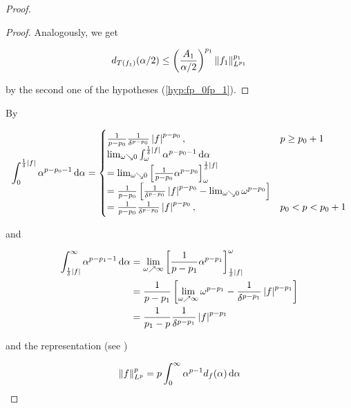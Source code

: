 \begin{proof}
\begin{proof}
Analogously, we get  

\begin{equation*}
	d_{T(f_1)}(\alpha/2) \leq \del{\frac{A_1}{\alpha/2}}^{p_1} \norm[0]{f_1}^{p_1}_{L^{p_1}}
	\label{est:p_1}
\end{equation*}

\noindent by the second one of the hypotheses (\ref{hyp:fp_0fp_1}).
\end{proof}

By

\begin{equation*}
	\begin{aligned}
		\int_0^{\frac{1}{\delta}\abs[0]{ f}}\alpha^{p-p_0-1} \d\alpha = 
			\begin{cases}
				\frac{1}{p-p_0}\frac{1}{\delta^{p-p_0}}\abs[0]{ f }^{p - p_0}, & p \geq p_0 + 1\\
				\lim_{\omega \searrow 0} \int_\omega^{\frac{1}{\delta}\abs[0]{ f}}\alpha^{p-p_0-1} \d\alpha\\
				= \lim_{\omega \searrow 0}\sbr{\frac{1}{p-p_0}\alpha^{p - p_0}}_\omega^{\frac{1}{\delta}\abs[0]{ f}}\\
				= \frac{1}{p-p_0}\sbr{\frac{1}{\delta^{p-p_0}}\abs[0]{ f }^{p - p_0} - \lim_{\omega \searrow 0} \omega^{p-p_0}}\\
				= \frac{1}{p-p_0}\frac{1}{\delta^{p-p_0}} \abs[0]{ f}^{p - p_0}, & p_0 < p < p_0 + 1
			\end{cases}
	\end{aligned}
\end{equation*}

\noindent and

\begin{equation*}
	\begin{aligned}
		\int_{\frac{1}{\delta}\abs[0]{ f}}^{\infty}\alpha^{p-p_1-1} \d\alpha &= \lim_{\omega \nearrow \infty} \sbr{ \frac{1}{p - p_1} \alpha^{p - p_1}}^\omega_{\frac{1}{\delta}\abs[0]{ f}}\\
		&= \frac{1}{p - p_1} \sbr{ \lim_{\omega \nearrow \infty} \omega^{p - p_1} - \frac{1}{\delta^{p - p_1}} \abs[0]{ f}^{p - p_1}}\\
		&= \frac{1}{p_1 - p}\frac{1}{\delta^{p-p_1}} \abs[0]{ f }^{p - p_1}
	\end{aligned}
\end{equation*}

\noindent and the representation (see \cite[5]{grafakos:fourier:2014}) 

\begin{equation*}
	\norm[0]{f}^p_{L^p} = p \int_0^{\infty} \alpha^{p-1}d_f(\alpha) \d\alpha
\end{equation*}


\end{proof}
